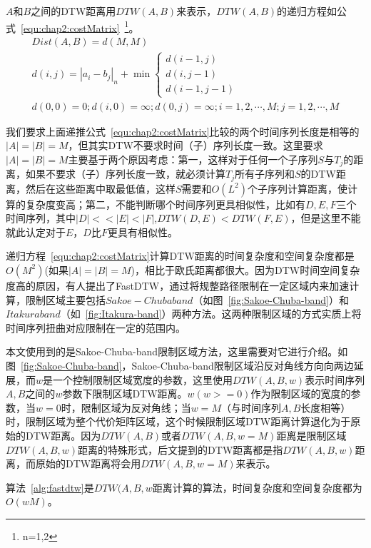 $A$和$B$之间的DTW距离用$DTW(A,B)$来表示，$DTW(A,B)$的递归方程如公式~\ref{equ:chap2:costMatrix}~\cite{sart2010accelerating}\footnote{n=1,2}。
\begin{equation}
\label{equ:chap2:costMatrix}
\begin{array}{l}
Dist(A,B) = d(M,M) \\ [0.3cm]
d(i,j) = |a_i-b_j|_n + \min
\begin{cases}
d(i-1,j)\\
d(i,j-1)\\
d(i-1,j-1)
\end{cases}\\[0.2cm]
d(0,0)=0;d(i,0)=\infty;d(0,j)=\infty;i=1,2,\cdots,M;j=1,2,\cdots,M 
\end{array}
\end{equation}


我们要求上面递推公式~\ref{equ:chap2:costMatrix}比较的两个时间序列长度是相等的$|A|=|B|= M$，但其实DTW不要求时间（子）序列长度一致。这里要求$|A|=|B|= M$主要基于两个原因考虑：第一，这样对于任何一个子序列$S$与$T_j$的距离，如果不要求（子）序列长度一致，就必须计算$T_j$所有子序列和$S$的DTW距离，然后在这些距离中取最低值，这样$S$需要和$O(L^2)$个子序列计算距离，使计算的复杂度变高；第二，不能判断哪个时间序列更具相似性，比如有$D,E,F$三个时间序列，其中$|D|<<|E|<|F|$,$DTW(D,E) < DTW(F,E)$，但是这里不能就此认定对于$E$，$D$比$F$更具有相似性。

递归方程~\ref{equ:chap2:costMatrix}计算DTW距离的时间复杂度和空间复杂度都是$O(M^2)$(如果$|A|=|B|=M$)，相比于欧氏距离都很大。因为DTW时间空间复杂度高的原因，有人提出了FastDTW\cite{salvador2007toward}，通过将规整路径限制在一定区域内来加速计算，限制区域主要包括$Sakoe-Chuba band$（如图~\ref{fig:Sakoe-Chuba-band}）和$Itakura band$（如~\ref{fig:Itakura-band}）两种方法。这两种限制区域的方式实质上将时间序列扭曲对应限制在一定的范围内。

本文使用到的是Sakoe-Chuba-band限制区域方法，这里需要对它进行介绍。如图~\ref{fig:Sakoe-Chuba-band}，Sakoe-Chuba-band限制区域沿反对角线方向向两边延展，而$w$是一个控制限制区域宽度的参数，这里使用$DTW(A,B,w)$表示时间序列$A,B$之间的$w$参数下限制区域DTW距离。$w(w>=0)$作为限制区域的宽度的参数，当$w=0$时，限制区域为反对角线；当$w=M$（与时间序列$A,B$长度相等）时，限制区域为整个代价矩阵区域，这个时候限制区域DTW距离计算退化为于原始的DTW距离。因为$DTW(A,B)$或者$DTW(A,B,w=M)$距离是限制区域$DTW(A,B,w)$距离的特殊形式，后文提到的DTW距离都是指$DTW(A,B,w)$距离，而原始的DTW距离将会用$DTW(A,B,w=M)$来表示。

算法~\ref{alg:fastdtw}是$DTW(A,B,w$距离计算的算法，时间复杂度和空间复杂度都为$O(wM)$。

